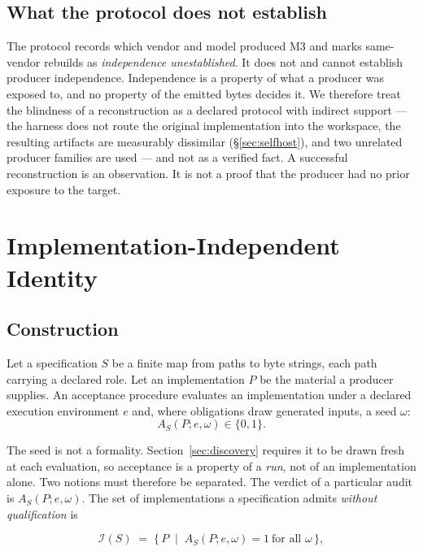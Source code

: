\documentclass[10pt,twocolumn]{article}
\begin{document}
\subsection{What the protocol does not establish}

The protocol records which vendor and model produced M3 and marks
same-vendor rebuilds as \emph{independence unestablished}. It does not
and cannot establish producer independence. Independence is a property of
what a producer was exposed to, and no property of the emitted bytes
decides it. We therefore treat the blindness of a reconstruction as a
declared protocol with indirect support --- the harness does not route
the original implementation into the workspace, the resulting artifacts
are measurably dissimilar (\S\ref{sec:selfhost}), and two unrelated
producer families are used --- and not as a verified fact. A successful
reconstruction is an observation. It is not a proof that the producer had
no prior exposure to the target.

\section{Implementation-Independent Identity}
\label{sec:identity}

\subsection{Construction}

Let a specification $S$ be a finite map from paths to byte strings, each
path carrying a declared role. Let an implementation $P$ be the material
a producer supplies. An acceptance procedure evaluates an implementation
under a declared execution environment $e$ and, where obligations draw
generated inputs, a seed $\omega$:
\begin{equation}
A_S(P;e,\omega) \in \{0,1\}.
\label{eq:accept}
\end{equation}

The seed is not a formality. Section~\ref{sec:discovery} requires it to
be drawn fresh at each evaluation, so acceptance is a property of a
\emph{run}, not of an implementation alone. Two notions must therefore
be separated. The verdict of a particular audit is
$A_S(P;e,\omega)$. The set of implementations a specification admits
\emph{without qualification} is

\begin{equation}
\mathcal{I}(S) \;=\; \{\,P \;\mid\; A_S(P;e,\omega) = 1
  \ \text{for all } \omega\,\},
\label{eq:admitted}
\end{equation}
\end{document}

